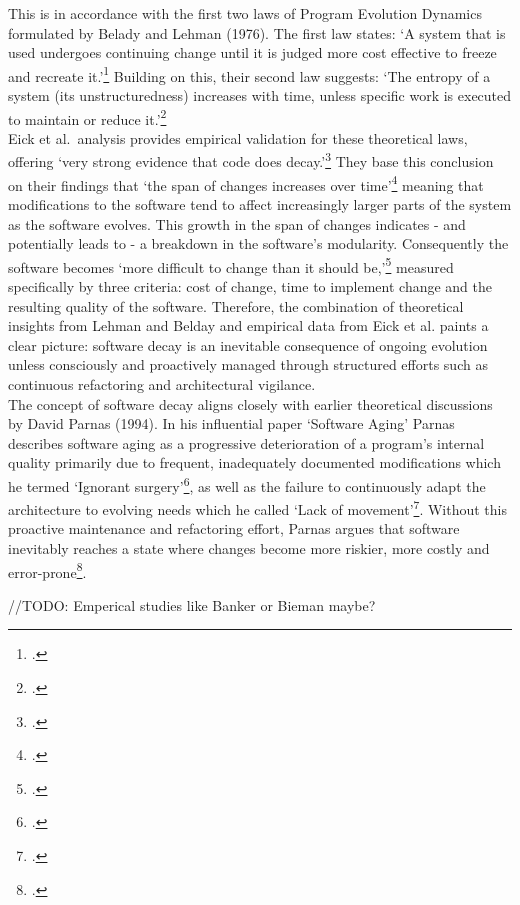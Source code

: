 This is in accordance with the first two laws of Program Evolution Dynamics formulated by Belady and Lehman (1976).
The first law states: `A system that is used undergoes continuing change until it is judged more cost effective to freeze and recreate it.'\footcite[228]{beladyModelLargeProgram1976}
Building on this, their second law suggests: `The entropy of a system (its unstructuredness) increases with time, unless specific work is executed to maintain or reduce it.'\footcite[228]{beladyModelLargeProgram1976}\\

Eick et al.\ analysis provides empirical validation for these theoretical laws, offering `very strong evidence that code does decay.'\footcite[7]{eickDoesCodeDecay2001}
They base this conclusion on their findings that `the span of changes increases over time'\footcite[7]{eickDoesCodeDecay2001} meaning that modifications to the software tend to affect increasingly larger parts of the system as the software evolves. This growth in the span of changes indicates - and potentially leads to -
a breakdown in the software's modularity. Consequently the software becomes `more difficult to change than it should be,'\footcite[3]{eickDoesCodeDecay2001} measured specifically by three criteria: cost of change, time to implement change and the resulting quality of the software.
Therefore, the combination of theoretical insights from Lehman and Belday and empirical data from Eick et al. paints a clear picture: software decay is an inevitable consequence of ongoing evolution unless consciously and proactively managed through structured efforts such as continuous refactoring and architectural vigilance.\\

The concept of software decay aligns closely with earlier theoretical discussions by David Parnas (1994). In his influential paper `Software Aging' Parnas describes software aging as a progressive deterioration of a program's internal quality primarily due to frequent, 
inadequately documented modifications which he termed `Ignorant surgery'\footcite[280]{296790}, as well as the failure to continuously adapt the architecture to evolving needs which he called `Lack of movement'\footcite[280]{296790}.
Without this proactive maintenance and refactoring effort, Parnas argues that software inevitably reaches a state where changes become more riskier, more costly and error-prone\footcite[280-281]{296790}.

//TODO: Emperical studies like Banker or Bieman maybe?


